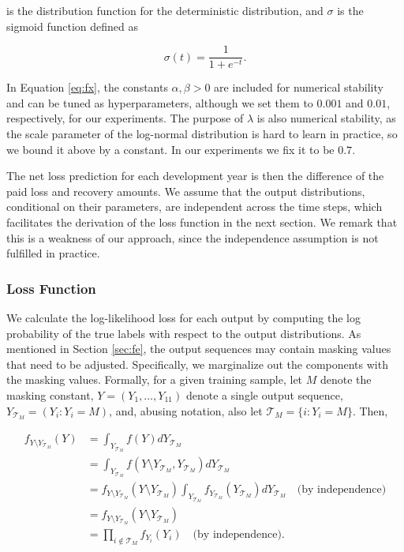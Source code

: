 \documentclass{article}
\begin{document}
is the distribution function for the deterministic distribution, and $\sigma$ is the sigmoid function defined as

\begin{equation}
    \sigma(t) = \frac{1}{1 + e^{-t}}.
\end{equation}

In Equation \ref{eq:fx}, the constants $\alpha, \beta > 0$ are included for numerical stability and can be tuned as hyperparameters, although we set them to $0.001$ and $0.01$, respectively, for our experiments. The purpose of $\lambda$ is also numerical stability, as the scale parameter of the log-normal distribution is hard to learn in practice, so we bound it above by a constant. In our experiments we fix it to be $0.7$.

The net loss prediction for each development year is then the difference of the paid loss and recovery amounts. We assume that the output distributions, conditional on their parameters, are independent across the time steps, which facilitates the derivation of the loss function in the next section. We remark that this is a weakness of our approach, since the independence assumption is not fulfilled in practice.

\subsubsection{Loss Function}\label{sec:loss-function}

We calculate the log-likelihood loss for each output by computing the log probability of the true labels with respect to the output distributions. As mentioned in Section \ref{sec:fe}, the output sequences may contain masking values that need to be adjusted. Specifically, we marginalize out the components with the masking values. Formally, for a given training sample, let $M$ denote the masking constant, $Y=(Y_1,\dots,Y_{11})$ denote a single output sequence, $Y_{\mathcal{T}_M} = (Y_i: Y_i = M)$, and, abusing notation, also let $\mathcal{T}_M = \{i: Y_i = M\}$. Then,

\begin{align}
    f_{Y\setminus Y_{\mathcal{T}_M}}(Y) &= \int_{Y_{\mathcal{T}_M}} f(Y) dY_{\mathcal{T}_M}\\
         &= \int_{Y_{\mathcal{T}_M}} f(Y\setminus Y_{\mathcal{T}_M}, Y_{\mathcal{T}_M}) dY_{\mathcal{T}_M}\\
         &= f_{Y\setminus Y_{\mathcal{T}_M}}(Y\setminus Y_{\mathcal{T}_M}) \int_{Y_{\mathcal{T}_M}} f_{Y_{\mathcal{T}_M}}(Y_{\mathcal{T}_M}) dY_{\mathcal{T}_M} \quad \text{(by independence)}\\
         &= f_{Y\setminus Y_{\mathcal{T}_M}}(Y\setminus Y_{\mathcal{T}_M})\\
         &= \prod_{i \notin \mathcal{T}_M} f_{Y_i}(Y_i) \quad \text{(by independence)}.
\end{align}
\end{document}
